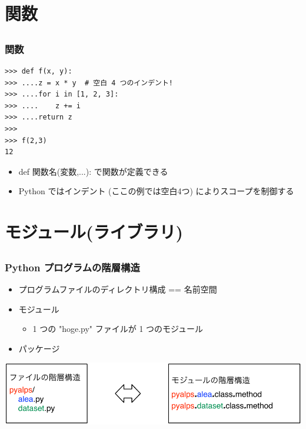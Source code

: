 \section{関数}
\subsection*{\redm\whiteb\greenb}

\begin{frame}[t,fragile]
\frametitle{関数}
\begin{lstlisting}
>>> def f(x, y):
>>> ....z = x * y  # 空白 4 つのインデント!
>>> ....for i in [1, 2, 3]:
>>> ....    z += i
>>> ....return z
>>>
>>> f(2,3)
12
\end{lstlisting}
\begin{itemize}
\item def 関数名(変数,...): で関数が定義できる
\item Python ではインデント (ここの例では空白4つ) によりスコープを制御する
\end{itemize}
\end{frame}

\section{モジュール(ライブラリ)}
\subsection*{\redm\whiteb\greenb}

\begin{frame}[t]
\frametitle{Python プログラムの階層構造}
\begin{itemize}
\item プログラムファイルのディレクトリ構成 == 名前空間
\item モジュール
\begin{itemize}
 \item 1 つの "hoge.py" ファイルが 1 つのモジュール
\end{itemize}
\item パッケージ
\end{itemize}
\includegraphics[width=\textwidth]{module.pdf}
\end{frame}

